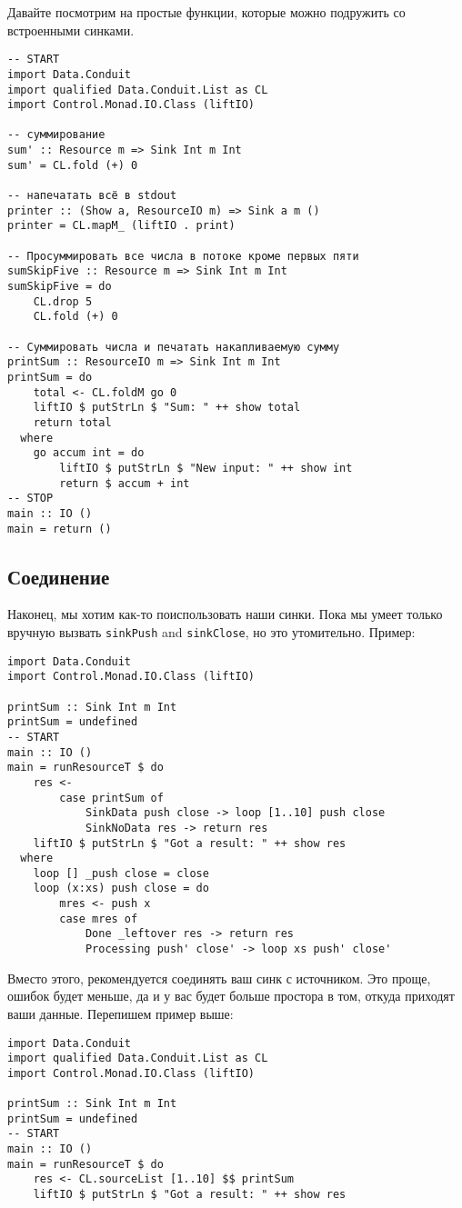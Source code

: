 Давайте посмотрим на простые функции, которые можно подружить со встроенными
синками.
\begin{lstlisting}
-- START
import Data.Conduit
import qualified Data.Conduit.List as CL
import Control.Monad.IO.Class (liftIO)

-- суммирование
sum' :: Resource m => Sink Int m Int
sum' = CL.fold (+) 0

-- напечатать всё в stdout
printer :: (Show a, ResourceIO m) => Sink a m ()
printer = CL.mapM_ (liftIO . print)

-- Просуммировать все числа в потоке кроме первых пяти
sumSkipFive :: Resource m => Sink Int m Int
sumSkipFive = do
    CL.drop 5
    CL.fold (+) 0

-- Суммировать числа и печатать накапливаемую сумму
printSum :: ResourceIO m => Sink Int m Int
printSum = do
    total <- CL.foldM go 0
    liftIO $ putStrLn $ "Sum: " ++ show total
    return total
  where
    go accum int = do
        liftIO $ putStrLn $ "New input: " ++ show int
        return $ accum + int
-- STOP
main :: IO ()
main = return ()
\end{lstlisting}

\subsection{Соединение}
Наконец, мы хотим как-то поиспользовать наши синки. Пока мы умеет только вручную вызвать
\verb*|sinkPush| and \verb*|sinkClose|, но это утомительно. Пример:
\begin{lstlisting}
import Data.Conduit
import Control.Monad.IO.Class (liftIO)

printSum :: Sink Int m Int
printSum = undefined
-- START
main :: IO ()
main = runResourceT $ do
    res <-
        case printSum of
            SinkData push close -> loop [1..10] push close
            SinkNoData res -> return res
    liftIO $ putStrLn $ "Got a result: " ++ show res
  where
    loop [] _push close = close
    loop (x:xs) push close = do
        mres <- push x
        case mres of
            Done _leftover res -> return res
            Processing push' close' -> loop xs push' close'
\end{lstlisting}
Вместо этого, рекомендуется соединять ваш синк с источником. Это проще, 
ошибок будет меньше, да и у вас будет больше простора в том, откуда приходят ваши данные.
Перепишем пример выше:
\begin{lstlisting}
import Data.Conduit
import qualified Data.Conduit.List as CL
import Control.Monad.IO.Class (liftIO)

printSum :: Sink Int m Int
printSum = undefined
-- START
main :: IO ()
main = runResourceT $ do
    res <- CL.sourceList [1..10] $$ printSum
    liftIO $ putStrLn $ "Got a result: " ++ show res
\end{lstlisting}

